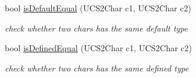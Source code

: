 \begin{CompactItemize}
bool \hyperlink{classla__manager_1_1CharTypeTable_98b7aabf9aad40b466d02a3caa023c6c}{isDefaultEqual} (UCS2Char c1, UCS2Char c2)
\begin{CompactList}\small\item\em check whether two chars has the same default type \item\end{CompactList}\item 
bool \hyperlink{classla__manager_1_1CharTypeTable_bcbf2007f841e5cbb37ff00e3fa8584a}{isDefinedEqual} (UCS2Char c1, UCS2Char c2)
\begin{CompactList}\small\item\em check whether two chars has the same defined type \item\end{CompactList}\end{CompactItemize}
